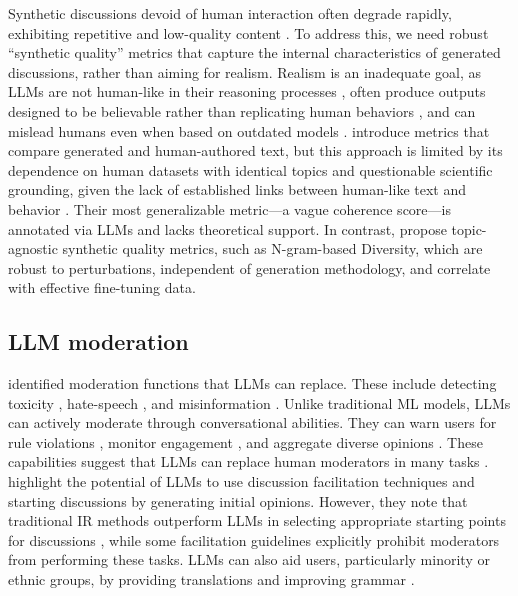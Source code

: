 Synthetic discussions devoid of human interaction often degrade rapidly, exhibiting repetitive and low-quality content \citep{ulmer2024}. To address this, we need robust “synthetic quality” metrics that capture the internal characteristics of generated discussions, rather than aiming for realism. Realism is an inadequate goal, as \acp{LLM} are not human-like in their reasoning processes \citep{rossi_2024}, often produce outputs designed to be believable rather than replicating human behaviors \citep{rossi_2024, anthis_2025}, and can mislead humans even when based on outdated models \citep{rossi_2024}. \citet{balog_2024} introduce metrics that compare generated and human-authored text, but this approach is limited by its dependence on human datasets with identical topics and questionable scientific grounding, given the lack of established links between human-like text and behavior \citep{rossi_2024}. Their most generalizable metric—a vague coherence score—is annotated via \acp{LLM} and lacks theoretical support. In contrast, \citet{ulmer2024} propose topic-agnostic synthetic quality metrics, such as N-gram-based Diversity, which are robust to perturbations, independent of generation methodology, and correlate with effective fine-tuning data.


\subsection{LLM moderation}

\citet{korre2025evaluation} identified moderation functions that \acp{LLM} can replace. These include detecting toxicity \cite{kang-qian-2024-implanting, Wang2022ToxicityDW}, hate-speech \cite{Nirmal2024TowardsIH, shi-2024-hatespeech}, and misinformation \cite{Liu2024DetectIJ, Xu2024ACS}. Unlike traditional \ac{ML} models, \acp{LLM} can actively moderate through conversational abilities. They can warn users for rule violations \cite{Kumar_AbuHashem_Durumeric_2024}, monitor engagement \cite{schroeder-etal-2024-fora}, and aggregate diverse opinions \cite{small-polis-llm}. These capabilities suggest that \acp{LLM} can replace human moderators in many tasks \cite{small-polis-llm, seering_self_moderation}.  \citet{small-polis-llm} highlight the potential of \acp{LLM} to use discussion facilitation techniques and starting discussions by generating initial opinions. However, they note that traditional \ac{IR} methods outperform \acp{LLM} in selecting appropriate starting points for discussions \cite{karadzhov2023delidata}, while some facilitation guidelines \cite{dimitra-book} explicitly prohibit moderators from performing these tasks. \acp{LLM} can also aid users, particularly minority or ethnic groups, by providing translations and improving grammar \cite{Tsai2024Generative}. 

